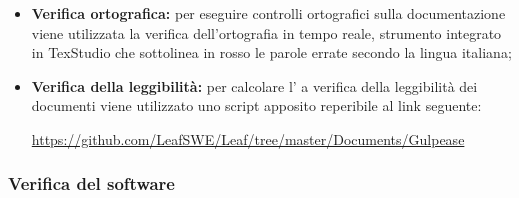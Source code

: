 \documentclass[../NormediProgetto.tex]{subfiles}
\begin{document}
	\begin{itemize}
		\item \textbf{Verifica ortografica:} per eseguire controlli ortografici sulla documentazione viene utilizzata la verifica dell’ortografia in tempo reale, strumento integrato in TexStudio che sottolinea in rosso le parole errate secondo la lingua italiana;
		
		\item \textbf{Verifica della leggibilità:} per calcolare l' a verifica della leggibilità dei documenti viene utilizzato uno script apposito reperibile al link seguente:
		\begin{center}
			\centerline{\url{https://github.com/LeafSWE/Leaf/tree/master/Documents/Gulpease}}
		\end{center}
	\end{itemize}
	
	\subsubsection{Verifica del software}
	
\end{document}
